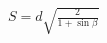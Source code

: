 \documentclass[border=2.5pt]{standalone}
\begin{document}
$\displaystyle S=d\sqrt{\frac2{1+\sin\beta}}$
\end{document}

